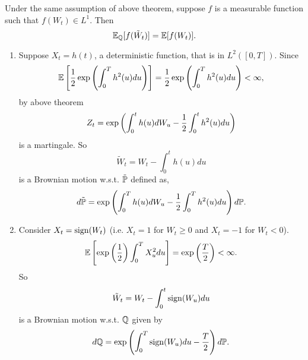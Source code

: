 \begin{cor}
    Under the same assumption of above theorem, suppose $f$ is a measurable function such that $f(W_t) \in L^1$. Then
    \begin{equation*}
        \mathbb{E}_{\mathbb{Q}}[f(\tilde{W}_t)] = \mathbb{E}[f(W_t)].
    \end{equation*}
\end{cor}

\begin{exam}
    \begin{enumerate}[label=(\arabic{*})]
        \item Suppose $X_t = h(t)$, a deterministic function, that is in $L^2([0,T])$. Since
        \begin{equation*}
            \mathbb{E}\left[\frac{1}{2}\exp \left(\int_0^T h^2(u)du\right)\right] = \frac{1}{2}\exp \left(\int_0^T h^2(u)du\right) < \infty,
        \end{equation*}
        by above theorem
        \begin{equation*}
            Z_t = \exp \left(\int_0^th(u)dW_u - \frac{1}{2}\int_0^th^2(u)du\right)
        \end{equation*}
        is a martingale. So
        \begin{equation*}
            \tilde{W}_t = W_t - \int_0^t h(u)du
        \end{equation*}
        is a Brownian motion w.s.t. $\tilde{\mathbb{P}}$ defined as,
        \begin{equation*}
            d\tilde{\mathbb{P}} = \exp\left(\int_0^Th(u)dW_u - \frac{1}{2}\int_0^Th^2(u)du\right) d\mathbb{P}.
        \end{equation*}

        \item Consider $X_t = \operatorname{sign} (W_t)$ (i.e. $X_t = 1$ for $W_t \geq 0$ and $X_t = -1$ for $W_t < 0$).
        \begin{equation*}
            \mathbb{E}\left[\exp\left(\frac{1}{2}\right) \int_0^T X_u^2 du\right] = \exp\left(\frac{T}{2}\right) < \infty.
        \end{equation*}
        So
        \begin{equation*}
            \tilde{W}_t = W_t - \int_0^t \operatorname{sign}(W_u)du
        \end{equation*}
        is a Brownian motion w.s.t. $\mathbb{Q}$ given by
        \begin{equation*}
            d\mathbb{Q} = \exp \left(\int_0^T \operatorname{sign}(W_u)du -\frac{T}{2}\right)d\mathbb{P}.
        \end{equation*}
    \end{enumerate}
\end{exam}

